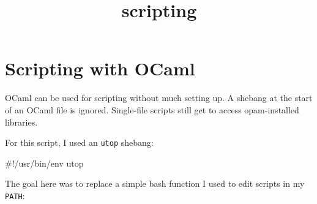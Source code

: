\documentclass[11pt]{article}
\title{scripting}
\newenvironment{Shaded}{}{}
\newcommand{\KeywordTok}[1]{\textcolor[rgb]{0.00,0.44,0.13}{\textbf{{#1}}}}
\newcommand{\StringTok}[1]{\textcolor[rgb]{0.25,0.44,0.63}{{#1}}}
\newcommand{\OtherTok}[1]{\textcolor[rgb]{0.00,0.44,0.13}{{#1}}}
\newcommand{\FunctionTok}[1]{\textcolor[rgb]{0.02,0.16,0.49}{{#1}}}
\newcommand{\NormalTok}[1]{{#1}}
\newcommand{\VariableTok}[1]{\textcolor[rgb]{0.10,0.09,0.49}{{#1}}}
\newcommand{\ControlFlowTok}[1]{\textcolor[rgb]{0.00,0.44,0.13}{\textbf{{#1}}}}
\newcommand{\OperatorTok}[1]{\textcolor[rgb]{0.40,0.40,0.40}{{#1}}}
\newcommand{\BuiltInTok}[1]{{#1}}
\newcommand{\ExtensionTok}[1]{{#1}}
\newcommand{\AttributeTok}[1]{\textcolor[rgb]{0.49,0.56,0.16}{{#1}}}
\begin{document}
    
    \maketitle
    
    

    
    \hypertarget{scripting-with-ocaml}{%
\section{Scripting with OCaml}\label{scripting-with-ocaml}}

    OCaml can be used for scripting without much setting up. A shebang at
the start of an OCaml file is ignored. Single-file scripts still get to
access opam-installed libraries.

For this script, I used an \texttt{utop} shebang:

    \begin{Shaded}
\begin{Highlighting}[]
\NormalTok{\#!/usr/bin/env utop}
\end{Highlighting}
\end{Shaded}

    The goal here was to replace a simple bash function I used to edit
scripts in my \texttt{PATH}:

    \begin{Shaded}
\end{Shaded}
\end{document}
